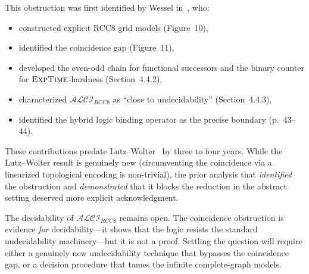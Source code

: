 \documentclass[11pt]{article}
\newcommand{\ALCIRCC}[1]{\ensuremath{\mathcal{ALCI}_{\mathit{RCC#1}}}}
\newcommand{\EXPTIME}{\textsc{ExpTime}}
\begin{document}
This obstruction was first identified by Wessel in~\cite{Wessel2003}, who:
\begin{itemize}
  \item constructed explicit RCC8 grid models (Figure~10),
  \item identified the coincidence gap (Figure~11),
  \item developed the even-odd chain for functional successors and the binary
    counter for $\EXPTIME$-hardness (Section~4.4.2),
  \item characterized $\ALCIRCC{8}$ as ``close to undecidability'' (Section~4.4.3),
  \item identified the hybrid logic binding operator as the precise boundary
    (p.~43--44).
\end{itemize}
These contributions predate Lutz--Wolter~\cite{LutzWolter2006} by three to
four years.  While the Lutz--Wolter result is genuinely new (circumventing the
coincidence via a linearized topological encoding is non-trivial), the prior
analysis that \emph{identified} the obstruction and \emph{demonstrated} that it
blocks the reduction in the abstract setting deserved more explicit
acknowledgment.

The decidability of $\ALCIRCC{8}$ remains open.  The coincidence obstruction
is evidence \emph{for} decidability---it shows that the logic resists the
standard undecidability machinery---but it is not a proof.  Settling the
question will require either a genuinely new undecidability technique that
bypasses the coincidence gap, or a decision procedure that tames the infinite
complete-graph models.

\bigskip
\end{document}

